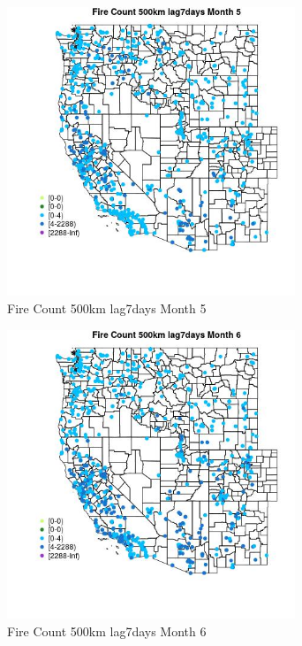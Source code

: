 \begin{figure} 
\centering  
\includegraphics[width=0.77\textwidth]{Code_Outputs/Report_ML_input_PM25_Step4_part_e_de_duplicated_aves_compiled_2019-05-21wNAs_MapObsMo5Fire_Count_500km_lag7days.jpg} 
\caption{\label{fig:Report_ML_input_PM25_Step4_part_e_de_duplicated_aves_compiled_2019-05-21wNAsMapObsMo5Fire_Count_500km_lag7days}Fire Count 500km lag7days Month 5} 
\end{figure} 
 

\clearpage 

\begin{figure} 
\centering  
\includegraphics[width=0.77\textwidth]{Code_Outputs/Report_ML_input_PM25_Step4_part_e_de_duplicated_aves_compiled_2019-05-21wNAs_MapObsMo6Fire_Count_500km_lag7days.jpg} 
\caption{\label{fig:Report_ML_input_PM25_Step4_part_e_de_duplicated_aves_compiled_2019-05-21wNAsMapObsMo6Fire_Count_500km_lag7days}Fire Count 500km lag7days Month 6} 
\end{figure} 
 


